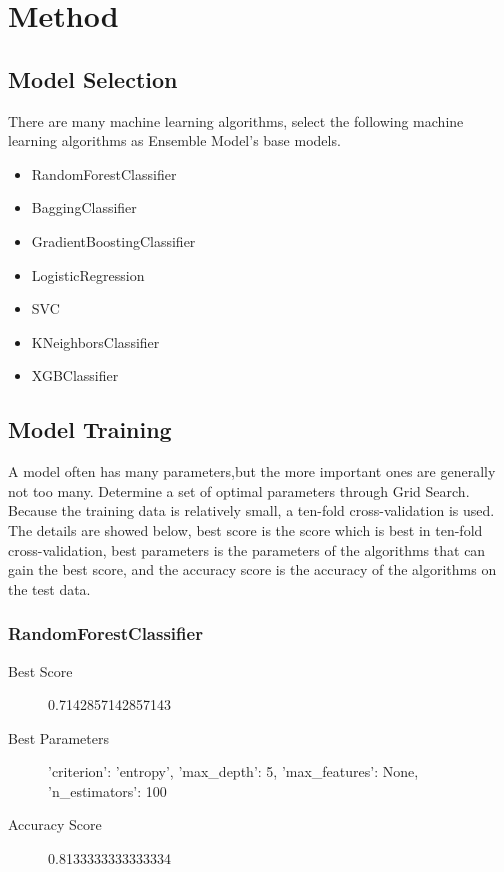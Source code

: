 \section{Method}

\subsection{Model Selection}
There are many machine learning algorithms, select the following machine learning algorithms as Ensemble Model’s base models. 

\begin{itemize}
	\item RandomForestClassifier
	\item BaggingClassifier
	\item GradientBoostingClassifier
	\item LogisticRegression
	\item SVC
	\item KNeighborsClassifier 
	\item XGBClassifier
\end{itemize}

\subsection{Model Training}
A model often has many parameters,but the more important ones are generally not too many. Determine a set of optimal parameters through Grid Search. Because the training data is relatively small, a ten-fold cross-validation is used. The details are showed below, best score is the score which is best in ten-fold cross-validation, best parameters is the parameters of the algorithms that can gain the best score, and the accuracy score is the accuracy of the algorithms on the test data.  

\subsubsection{RandomForestClassifier} 

\begin{description}
	\item[Best Score] 0.7142857142857143
	\item[Best Parameters] 'criterion': 'entropy', 'max_depth': 5, 'max_features': None, 'n_estimators': 100
	\item[Accuracy Score] 0.8133333333333334
\end{description}

